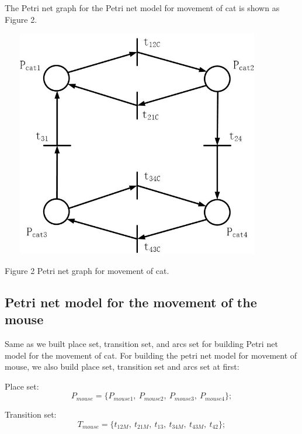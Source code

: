 \documentclass[11pt]{article}
\begin{document}
\begin{flushleft}
    The Petri net graph for the Petri net model for movement of cat is shown as Figure 2.
    \begin{center}
	\includegraphics[width=12cm,height=10cm]{movementofcat.JPG}
	
	Figure 2 Petri net graph for movement of cat.
	\end{center}
    
	\newpage
	\subsection{Petri net model for the movement of the mouse}
	Same as we built place set, transition set, and arcs set for building Petri net model for the movement of cat. For building the petri net model for movement of mouse, we also build place set, transition set and arcs set at first:
	
	Place set: $$P_{mouse}=\{P_{mouse1},\ P_{mouse2},\ P_{mouse3},\ P_{mouse4}\};$$
	
	Transition set: $$T_{mouse}=\{t_{12M},\ t_{21M},\ t_{13},\ t_{34M},\  t_{43M},\ t_{42}\};$$
	

\end{flushleft}
\end{document}
